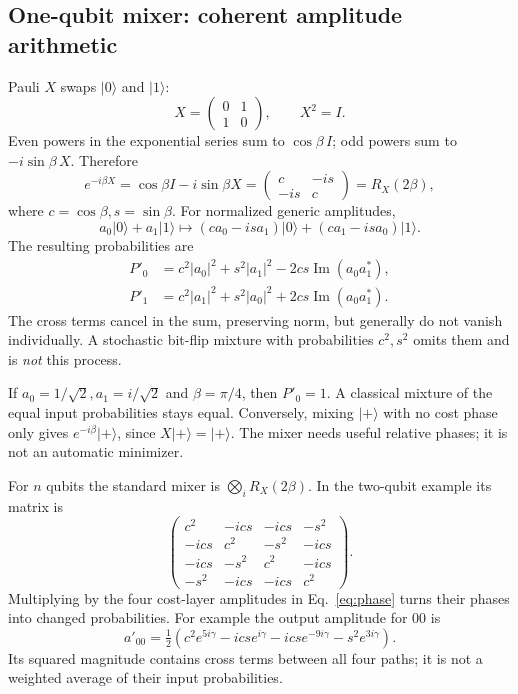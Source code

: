 \documentclass[11pt,letterpaper]{article}
\newcommand{\ket}[1]{\lvert #1\rangle}
\begin{document}
\subsection{One-qubit mixer: coherent amplitude arithmetic}\label{sec:mixer}
Pauli $X$ swaps $\ket0$ and $\ket1$:
\[
 X=\begin{pmatrix}0&1\\1&0\end{pmatrix},\qquad X^2=I.
\]
Even powers in the exponential series sum to $\cos\beta\,I$; odd powers sum to $-i\sin\beta\,X$. Therefore
\begin{equation}
 e^{-i\beta X}=\cos\beta I-i\sin\beta X
 =\begin{pmatrix}c&-is\\-is&c\end{pmatrix}=R_X(2\beta),\label{eq:mixer}
\end{equation}
where $c=\cos\beta,s=\sin\beta$. For normalized generic amplitudes,
\begin{equation}
 a_0\ket0+a_1\ket1\longmapsto
 (ca_0-isa_1)\ket0+(ca_1-isa_0)\ket1.
\end{equation}
The resulting probabilities are
\begin{align}
 P'_0&=c^2|a_0|^2+s^2|a_1|^2-2cs\operatorname{Im}(a_0a_1^*),\\
 P'_1&=c^2|a_1|^2+s^2|a_0|^2+2cs\operatorname{Im}(a_0a_1^*).\label{eq:cross}
\end{align}
The cross terms cancel in the sum, preserving norm, but generally do not vanish individually. A stochastic bit-flip mixture with probabilities $c^2,s^2$ omits them and is \emph{not} this process.

If $a_0=1/\sqrt2,a_1=i/\sqrt2$ and $\beta=\pi/4$, then $P'_0=1$. A classical mixture of the equal input probabilities stays equal. Conversely, mixing $\ket+$ with no cost phase only gives $e^{-i\beta}\ket+$, since $X\ket+=\ket+$. The mixer needs useful relative phases; it is not an automatic minimizer.

For $n$ qubits the standard mixer is $\bigotimes_iR_X(2\beta)$. In the two-qubit example its matrix is
\[
 \begin{pmatrix}
 c^2&-ics&-ics&-s^2\\
 -ics&c^2&-s^2&-ics\\
 -ics&-s^2&c^2&-ics\\
 -s^2&-ics&-ics&c^2
 \end{pmatrix}.
\]
Multiplying by the four cost-layer amplitudes in Eq.~\eqref{eq:phase} turns their phases into changed probabilities. For example the output amplitude for $00$ is
\[
 a'_{00}=\tfrac12\left(c^2e^{5i\gamma}-ics e^{i\gamma}-ics e^{-9i\gamma}-s^2e^{3i\gamma}\right).
\]
Its squared magnitude contains cross terms between all four paths; it is not a weighted average of their input probabilities.
\end{document}
